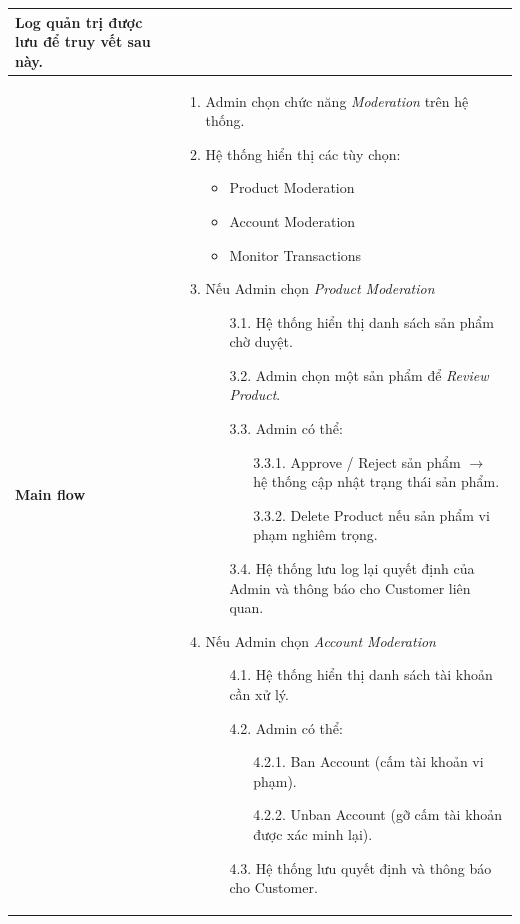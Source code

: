 \documentclass{article}
\begin{document}
\begin{table}[h!]
\begin{table}[h!]
\begin{tabular}{p{3cm} p{11cm}}
    Log quản trị được lưu để truy vết sau này. \\
\hline
\vspace{0.025cm}
\textbf{Main flow} & 
\begin{enumerate}
    \item Admin chọn chức năng \textit{Moderation} trên hệ thống.
    \item Hệ thống hiển thị các tùy chọn:
    \begin{itemize}
        \item Product Moderation
        \item Account Moderation
        \item Monitor Transactions
    \end{itemize}
    \item Nếu Admin chọn \textit{Product Moderation}
    \begin{itemize}
        \item[3.1.] Hệ thống hiển thị danh sách sản phẩm chờ duyệt.
        \item[3.2.] Admin chọn một sản phẩm để \textit{Review Product}.
        \item[3.3.] Admin có thể:
        \begin{itemize}
            \item[3.3.1.] Approve / Reject sản phẩm $\rightarrow$ hệ thống cập nhật trạng thái sản phẩm.
            \item[3.3.2.] Delete Product nếu sản phẩm vi phạm nghiêm trọng.
        \end{itemize}
        \item[3.4.] Hệ thống lưu log lại quyết định của Admin và thông báo cho Customer liên quan.
    \end{itemize}
    \item Nếu Admin chọn \textit{Account Moderation}
    \begin{itemize}
        \item[4.1.] Hệ thống hiển thị danh sách tài khoản cần xử lý.
        \item[4.2.] Admin có thể:
        \begin{itemize}
            \item[4.2.1.] Ban Account (cấm tài khoản vi phạm).
            \item[4.2.2.] Unban Account (gỡ cấm tài khoản được xác minh lại).
        \end{itemize}
        \item[4.3.] Hệ thống lưu quyết định và thông báo cho Customer.
    \end{itemize}

\end{enumerate}
\end{tabular}
\end{table}
\end{table}
\end{document}
